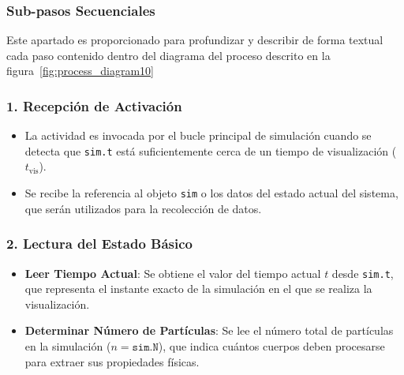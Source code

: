 \subsubsection{Sub-pasos Secuenciales}
Este apartado es proporcionado para profundizar y describir de forma textual cada paso contenido dentro del diagrama del proceso descrito en la figura~\ref{fig:process_diagram10}
\subsubsection*{1. Recepción de Activación}
\begin{itemize}
    \item La actividad es invocada por el bucle principal de simulación cuando se detecta que \texttt{sim.t} está suficientemente cerca de un tiempo de visualización ($t_{\text{vis}}$).
    \item Se recibe la referencia al objeto \texttt{sim} o los datos del estado actual del sistema, que serán utilizados para la recolección de datos.
\end{itemize}

\subsubsection*{2. Lectura del Estado Básico}
\begin{itemize}
    \item \textbf{Leer Tiempo Actual}: Se obtiene el valor del tiempo actual $t$ desde \texttt{sim.t}, que representa el instante exacto de la simulación en el que se realiza la visualización.
    \item \textbf{Determinar Número de Partículas}: Se lee el número total de partículas en la simulación ($n = \texttt{sim.N}$), que indica cuántos cuerpos deben procesarse para extraer sus propiedades físicas.
\end{itemize}

